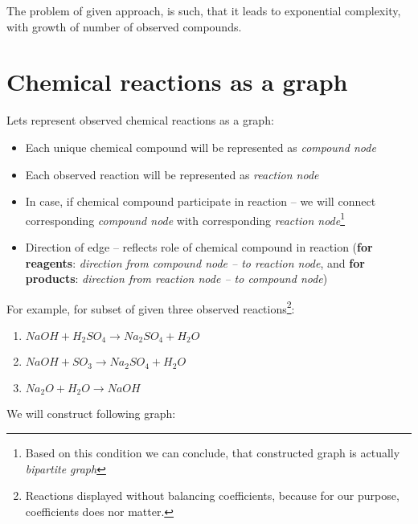 \documentclass[10pt]{article}
\begin{document}
The problem of given approach, is such, that it leads to exponential complexity, with growth of number of observed compounds.

\newpage

\section{Chemical reactions as a graph}

Lets represent observed chemical reactions as a graph: 
\begin{itemize}
    \setlength \itemsep{0em}
    \item Each unique chemical compound will be represented as \emph{compound node}
    \item Each observed reaction will be represented as \emph{reaction node}
    \item In case, if chemical compound participate in reaction -- we will connect corresponding \emph{compound node} with corresponding \emph{reaction node}\footnote{Based on this condition we can conclude, that constructed graph is actually \emph{bipartite graph}}
    \item Direction of edge -- reflects role of chemical compound in reaction (\textbf{for reagents}: \emph{direction from compound node -- to reaction node}, and \textbf{for products}: \emph{direction from reaction node -- to compound node})
\end{itemize}

\noindent For example, for subset of given three observed reactions\footnote{Reactions displayed without balancing coefficients, because for our purpose, coefficients does nor matter.}:

\begin{enumerate}
    \setlength \itemsep{0em}
    \item $NaOH + H_{2}SO_{4} \rightarrow Na_{2}SO_{4} + H_{2}O$
    \item $NaOH + SO_{3} \rightarrow Na_{2}SO_{4} + H_{2}O$
    \item $Na_{2}O + H_{2}O \rightarrow NaOH$
\end{enumerate}

\noindent We will construct following graph:
\end{document}
